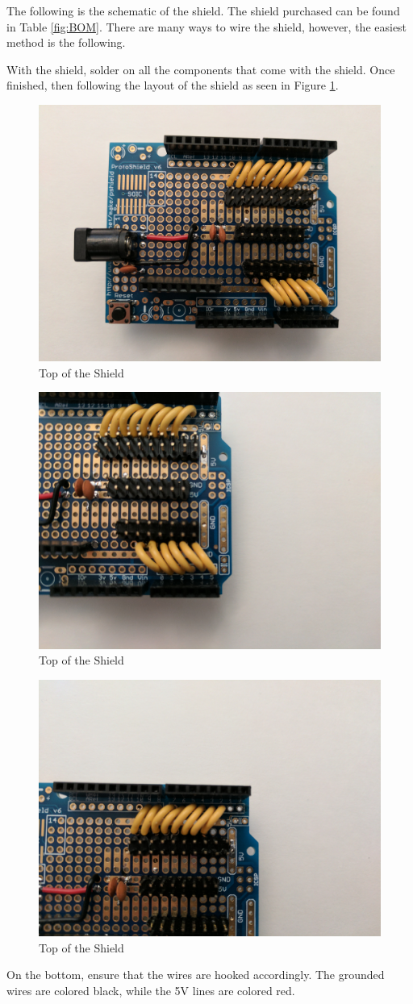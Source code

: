 \documentclass[11pt, a4paper]{report}
\begin{document}
The following is the schematic of the shield. The shield purchased can be found in Table \ref{fig:BOM}. There are many ways to wire the shield, however, the easiest method is the following. 

With the shield, solder on all the components that come with the shield. Once finished, then following the layout of the shield as seen in Figure \ref{fig:TOP}.


\begin{figure}[H]
\hspace*{-2cm}    
    \centering
    \includegraphics[width=.3\textwidth]{TOP.jpg}
    \caption{Top of the Shield}
    \label{fig:TOP}
\end{figure}


\begin{figure}[H]
\hspace*{-2cm}    
    \centering
    \includegraphics[width=.3\textwidth]{TOP1.jpg}
    \caption{Top of the Shield}
    \label{fig:TOP1}
\end{figure}

\begin{figure}[H]
\hspace*{-2cm}    
    \centering
    \includegraphics[width=.3\textwidth]{TOP2.jpg}
    \caption{Top of the Shield}
    \label{fig:TOP2}
\end{figure}

On the bottom, ensure that the wires are hooked accordingly. The grounded wires are colored black, while the 5V lines are colored red.
\end{document}
